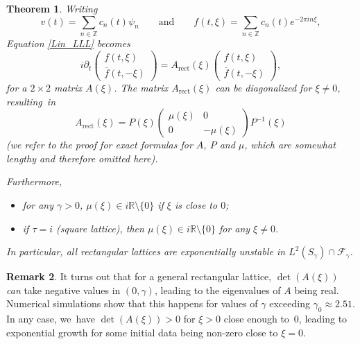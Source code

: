 \documentclass[10pt]{amsart}
\newtheorem{theorem}{Theorem}[section]
\theoremstyle{definition}
\newtheorem{remark}[theorem]{Remark}
\newcommand\Z{\mathbb Z}
\begin{document}
\begin{theorem}
\label{thmunstable}
Writing
\[
v(t) = \sum_{n \in \Z} c_n(t) \psi_n \qquad \text{and} \qquad
f(t,\xi) = \sum_{n \in \Z} c_n(t) e^{-2\pi i n\xi},
\]
Equation \eqref{Lin_LLL} becomes
\[
i \partial_t \begin{pmatrix} {f}(t,\xi) \\[2pt] \overline{{f}}(t,-\xi) \end{pmatrix} = A_{\mathrm{rect}}(\xi) \begin{pmatrix} {f}(t,\xi) \\[2pt] \overline{{f}}(t,-\xi) \end{pmatrix},
\]
for a $2\times 2$ matrix $A(\xi)$. The matrix $A_{\mathrm{rect}}(\xi) $ can be diagonalized for $\xi \neq 0$, resulting~in
\[
A_{\mathrm{rect}}(\xi) = P(\xi) \begin{pmatrix} \mu(\xi) & 0 \\[2pt] 0 & -\mu(\xi) \end{pmatrix} P^{-1}(\xi)
\]
(we refer to the proof for exact formulas for $A$, $P$ and $\mu$, which are somewhat lengthy and therefore omitted here).

Furthermore,
\begin{itemize}
\item for any $\gamma>0$, $\mu(\xi) \in i \mathbb{R} \setminus\{ 0 \}$ if $\xi$ is close to $0$;
\item if $\tau = i$ (square lattice), then $\mu(\xi) \in i \mathbb{R} \setminus\{ 0 \}$ for any $\xi \neq 0$.
\end{itemize}

In particular, all rectangular lattices are exponentially unstable in $L^2(S_\gamma) \cap \mathcal{F}_\gamma$.
\end{theorem}

\begin{remark}
It turns out that for a general rectangular lattice, $\det(A(\xi))$ \emph{can} take negative values in $(0,\gamma)$, leading to the eigenvalues of $A$ being real. Numerical simulations show that this happens for values of $\gamma$ exceeding $\gamma_0 \approx 2.51$. In any case, we~have $\det(A(\xi)) > 0$ for $\xi >0$ close enough to~$0$, leading to exponential growth for some initial data being non-zero close to $\xi = 0$.
\end{remark}
\end{document}
